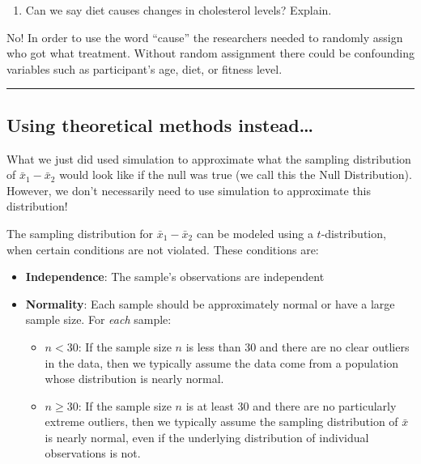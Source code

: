 \documentclass[
  letterpaper,
  DIV=11,
  numbers=noendperiod]{scrartcl}
\providecommand{\tightlist}{%
  \setlength{\itemsep}{0pt}\setlength{\parskip}{0pt}}\usepackage{longtable,booktabs,array}
\begin{document}
\begin{enumerate}
\def\labelenumi{\arabic{enumi}.}
\setcounter{enumi}{24}
\tightlist
\item
  Can we say diet causes changes in cholesterol levels? Explain.
\end{enumerate}

No! In order to use the word ``cause'' the researchers needed to
randomly assign who got what treatment. Without random assignment there
could be confounding variables such as participant's age, diet, or
fitness level.

\begin{center}\rule{0.5\linewidth}{0.5pt}\end{center}

\hypertarget{using-theoretical-methods-instead}{%
\subsection{Using theoretical methods
instead\ldots{}}\label{using-theoretical-methods-instead}}

What we just did used simulation to approximate what the sampling
distribution of \(\bar{x}_1-\bar{x}_2\) would look like if the null was
true (we call this the Null Distribution). However, we don't necessarily
need to use simulation to approximate this distribution!

The sampling distribution for \(\bar{x}_1-\bar{x}_2\) can be modeled
using a \(t\)-distribution, when certain conditions are not violated.
These conditions are:

\begin{itemize}
\item
  \textbf{Independence}: The sample's observations are independent
\item
  \textbf{Normality}: Each sample should be approximately normal or have
  a large sample size. For \emph{each} sample:

  \begin{itemize}
  \item
    \(n < 30\): If the sample size \(n\) is less than 30 and there are
    no clear outliers in the data, then we typically assume the data
    come from a population whose distribution is nearly normal.
  \item
    \(n \ge 30\): If the sample size \(n\) is at least 30 and there are
    no particularly extreme outliers, then we typically assume the
    sampling distribution of \(\bar{x}\) is nearly normal, even if the
    underlying distribution of individual observations is not.
  \end{itemize}
\end{itemize}
\end{document}
